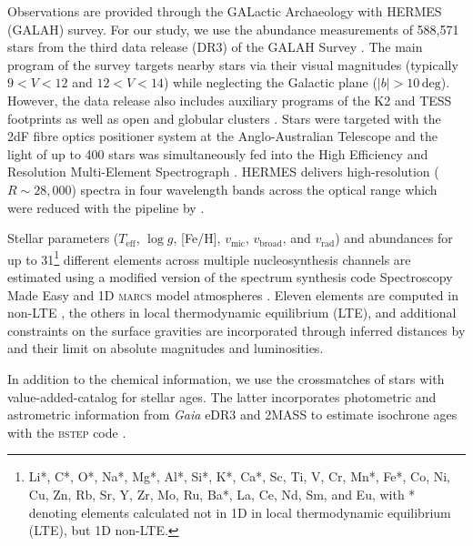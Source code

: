 \documentclass[fleqn,usenatbib]{mnras}
\newcommand{\Gaia}{\textit{Gaia}\xspace} %
\begin{document}
Observations are provided through the GALactic Archaeology with HERMES (GALAH) survey. For our study, we use the abundance measurements of 588,571 stars from the third data release (DR3) of the GALAH Survey \citep{Buder2021}. The main program of the survey targets nearby stars via their visual magnitudes (typically $9 < V < 12$ and $12 < V < 14$) while neglecting the Galactic plane ($\vert b \vert > 10\,\mathrm{deg}$). However, the data release also includes auxiliary programs of the K2 and TESS footprints \citep{Sharma2018, Sharma2019} as well as open and globular clusters \cite[for more details see][]{Buder2021}. Stars were targeted with the 2dF fibre optics positioner system at the Anglo-Australian Telescope \citep{Heijmans2012, Farrell2014} and the light of up to 400 stars was simultaneously fed into the High Efficiency and Resolution Multi-Element Spectrograph \citep[HERMES,][]{Barden2010, Sheinis2015}. HERMES delivers high-resolution ($R \sim 28,000$) spectra in four wavelength bands across the optical range which were reduced with the pipeline by \citep{Kos2017}.

Stellar parameters ($T_\text{eff}$, $\log g$, [Fe/H], $v_\text{mic}$, $v_\text{broad}$, and $v_\text{rad}$) and abundances for up to 31\footnote{Li*, C*, O*, Na*, Mg*, Al*, Si*, K*, Ca*, Sc, Ti, V, Cr, Mn*, Fe*, Co, Ni, Cu, Zn, Rb, Sr, Y, Zr, Mo, Ru, Ba*, La, Ce, Nd, Sm, and Eu, with * denoting elements calculated not in 1D in local thermodynamic equilibrium (LTE), but 1D non-LTE.} different elements across multiple nucleosynthesis channels are estimated using a modified version of the spectrum synthesis code Spectroscopy Made Easy \citep[\textsc{sme}][]{Valenti1996, Piskunov2017} and 1D \textsc{marcs} model atmospheres \citep{Gustafsson2008}. Eleven elements are computed in non-LTE \citep{Amarsi2020}, the others in local thermodynamic equilibrium (LTE), and additional constraints on the surface gravities are incorporated through inferred distances by \citet{BailerJones2021} and their limit on absolute magnitudes and luminosities.

In addition to the chemical information, we use the crossmatches of stars with value-added-catalog for stellar ages. The latter incorporates photometric and astrometric information from \Gaia eDR3 \citep{Lindegren2021a} and 2MASS \citep{Skrutskie2006} to estimate isochrone ages with the \textsc{bstep} code \citep{Sharma2018}.
\end{document}
